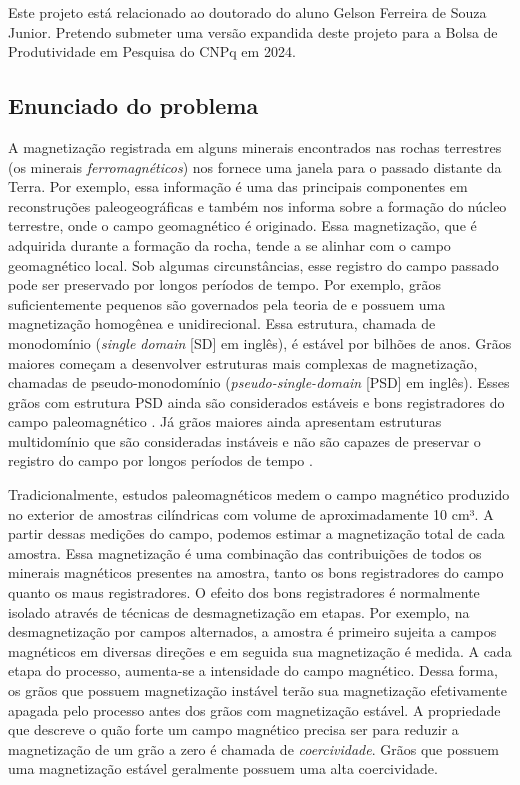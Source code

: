 \documentclass[12pt,a4paper,oneside]{book}
\begin{document}
Este projeto está relacionado ao doutorado do aluno Gelson Ferreira de Souza
Junior. Pretendo submeter uma versão expandida deste projeto para a Bolsa de
Produtividade em Pesquisa do CNPq em 2024.

\subsection{Enunciado do problema}

A magnetização registrada em alguns minerais encontrados nas rochas terrestres
(os minerais \textit{ferromagnéticos}) nos fornece uma janela para o passado
distante da Terra.
Por exemplo, essa informação é uma das principais componentes em reconstruções
paleogeográficas e também nos informa sobre a formação do núcleo terrestre,
onde o campo geomagnético é originado.
Essa magnetização, que é adquirida durante a formação da rocha, tende a se
alinhar com o campo geomagnético local.
Sob algumas circunstâncias, esse registro do campo passado pode ser preservado
por longos períodos de tempo.
Por exemplo, grãos suficientemente pequenos são governados pela teoria de
\citet{Neel1955} e possuem uma magnetização homogênea e unidirecional.
Essa estrutura, chamada de monodomínio (\textit{single domain} [SD] em inglês),
é estável por bilhões de anos.
Grãos maiores começam a desenvolver estruturas mais complexas de magnetização,
chamadas de pseudo-monodomínio (\textit{pseudo-single-domain} [PSD] em inglês).
Esses grãos com estrutura PSD ainda são considerados estáveis e bons
registradores do campo paleomagnético \citep{Nagy2017}.
Já grãos maiores ainda apresentam estruturas multidomínio que são consideradas
instáveis e não são capazes de preservar o registro do campo por longos
períodos de tempo \citep{deGroot2014}.

Tradicionalmente, estudos paleomagnéticos medem o campo magnético produzido no
exterior de amostras cilíndricas com volume de aproximadamente 10 cm³.
A partir dessas medições do campo, podemos estimar a magnetização total de cada
amostra.
Essa magnetização é uma combinação das contribuições de todos os minerais
magnéticos presentes na amostra, tanto os bons registradores do campo quanto
os maus registradores.
O efeito dos bons registradores é normalmente isolado através de técnicas de
desmagnetização em etapas.
Por exemplo, na desmagnetização por campos alternados, a amostra é primeiro
sujeita a campos magnéticos em diversas direções e em seguida sua magnetização
é medida.
A cada etapa do processo, aumenta-se a intensidade do campo magnético.
Dessa forma, os grãos que possuem magnetização instável terão sua magnetização
efetivamente apagada pelo processo antes dos grãos com magnetização estável.
A propriedade que descreve o quão forte um campo magnético precisa ser para
reduzir a magnetização de um grão a zero é chamada de \textit{coercividade}.
Grãos que possuem uma magnetização estável geralmente possuem uma alta
coercividade.
\end{document}
